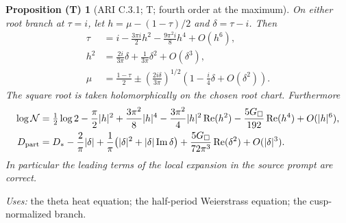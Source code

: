 \documentclass[11pt,a4paper]{article}
\theoremstyle{plain}
\newtheorem{proposition}[theorem]{Proposition (T)}
\theoremstyle{definition}
\begin{document}
\begin{proposition}[ARI C.3.1; T; fourth order at the maximum]\label{ari:C.3.1}
On either root branch at $\tau=i$, let
$h=\mu-(1-\tau)/2$ and $\delta=\tau-i$. Then
\begin{align*}
 \tau&=i-\frac{3\pi i}{2}h^2-\frac{9\pi^2i}{8}h^4+O(h^6),\\
 h^2&=\frac{2i}{3\pi}\delta+\frac1{3\pi}\delta^2+O(\delta^3),\\
 \mu&=\frac{1-\tau}{2}
  \mathbin{\pm}\left(\frac{2i\delta}{3\pi}\right)^{1/2}
          \left(1-\frac{i}{4}\delta+O(\delta^2)\right).
\end{align*}
The square root is taken holomorphically on the chosen root chart.
Furthermore
\begin{align}\label{ari:eq:cs-Li}
 \log \mathcal N={}&\tfrac12\log2-\frac\pi2|h|^2
   +\frac{3\pi^2}{8}|h|^4
   -\frac{3\pi^2}{4}|h|^2\operatorname{Re}(h^2)
   -\frac{5G_\square}{192}\operatorname{Re}(h^4)+O(|h|^6),\\
 D_{\rm part}={}&D_* -\frac2\pi|\delta|
  +\frac1\pi\bigl(|\delta|^2+|\delta|\operatorname{Im}\delta\bigr)
  +\frac{5G_\square}{72\pi^3}\operatorname{Re}(\delta^2)
  +O(|\delta|^3).\nonumber
\end{align}
In particular the leading terms of the local expansion in the source prompt are correct.
\end{proposition}
\noindent\textit{Uses:} the theta heat equation; the half-period Weierstrass equation; the cusp-normalized branch.\par
\end{document}
